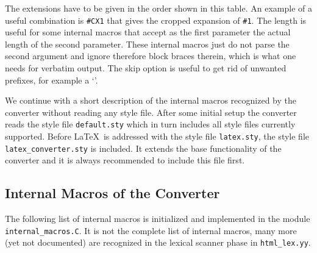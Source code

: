 \documentclass[11pt]{article}
\begin{document}
The extensions have to be given in the order shown in this table. An
example of a useful combination is {\tt \#CX1} that gives the cropped
expansion of {\tt \#1}. The length is useful for some internal macros
that accept as the first parameter the actual length of the second
parameter.  These internal macros just do not parse the second
argument and ignore therefore block braces therein, which is what one
needs for verbatim output. The skip option is useful to get rid of
unwanted prefixes, for example a `{\tt \Backslash}'.

We continue with a short description of the internal macros recognized
by the converter without reading any style file. After some initial
setup the converter reads the style file {\tt default.sty} which in
turn includes all style files currently supported. Before \LaTeX\ is
addressed with the style file {\tt latex.sty}, the style file {\tt
  latex\_converter.sty} is included. It extends the base functionality
of the converter and it is always recommended to include this file
first.

\subsection{Internal Macros of the Converter}

The following list of internal macros is initialized and implemented
in the module {\tt internal\_macros.C}. It is not the complete list of
internal macros, many more (yet not documented) are recognized in the
lexical scanner phase in {\tt html\_lex.yy}.
\end{document}
